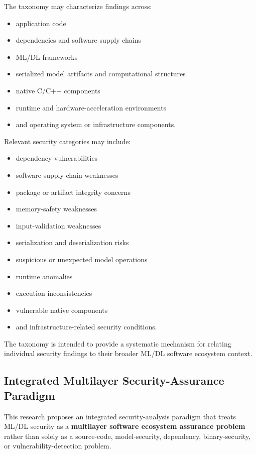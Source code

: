 \documentclass[
  12pt,
  letterpaper,
  oneside]{report}
\providecommand{\tightlist}{%
  \setlength{\itemsep}{0pt}\setlength{\parskip}{0pt}}
\begin{document}
The taxonomy may characterize findings across:

\begin{itemize}
\tightlist
\item
  application code
\item
  dependencies and software supply chains
\item
  ML/DL frameworks
\item
  serialized model artifacts and computational structures
\item
  native C/C++ components
\item
  runtime and hardware-acceleration environments
\item
  and operating system or infrastructure components.
\end{itemize}

Relevant security categories may include:

\begin{itemize}
\tightlist
\item
  dependency vulnerabilities
\item
  software supply-chain weaknesses
\item
  package or artifact integrity concerns
\item
  memory-safety weaknesses
\item
  input-validation weaknesses
\item
  serialization and deserialization risks
\item
  suspicious or unexpected model operations
\item
  runtime anomalies
\item
  execution inconsistencies
\item
  vulnerable native components
\item
  and infrastructure-related security conditions.
\end{itemize}

The taxonomy is intended to provide a systematic mechanism for relating
individual security findings to their broader ML/DL software ecosystem
context.

\subsection{Integrated Multilayer Security-Assurance Paradigm}\label{1213-integrated-multilayer-security-assurance-paradigm}

This research proposes an integrated security-analysis paradigm that
treats ML/DL security as a \textbf{multilayer software ecosystem
assurance problem} rather than solely as a source-code, model-security,
dependency, binary-security, or vulnerability-detection problem.
\end{document}
